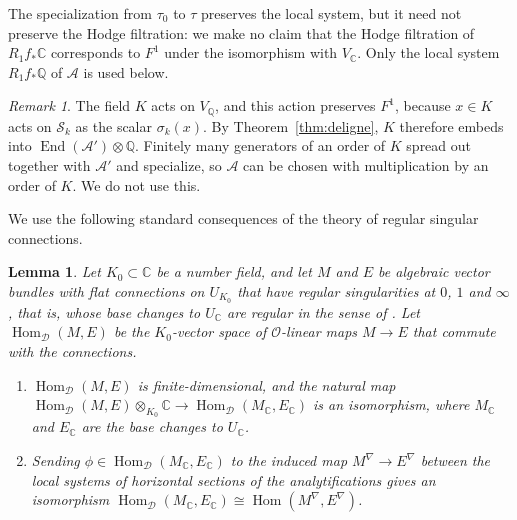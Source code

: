 \documentclass[11pt]{amsart}
\newtheorem{lemma}[theorem]{Lemma}
\theoremstyle{definition}
\theoremstyle{remark}
\newtheorem{remark}[theorem]{Remark}
\numberwithin{equation}{section}
\newcommand{\Q}{\mathbb{Q}}
\newcommand{\C}{\mathbb{C}}
\newcommand{\cS}{\mathcal{S}}
\newcommand{\cO}{\mathcal{O}}
\newcommand{\cD}{\mathcal{D}}
\newcommand{\cA}{\mathcal{A}}
\DeclareMathOperator{\Hom}{Hom}
\DeclareMathOperator{\End}{End}
\begin{document}
The specialization from $\tau_0$ to $\tau$ preserves the local system, but it need not preserve the Hodge filtration: we make no claim that the Hodge filtration of $R_1f_*\C$ corresponds to $F^1$ under the isomorphism with $V_\C$. Only the local system $R_1f_*\Q$ of $\cA$ is used below.

\begin{remark}\label{rem:mult}
The field $K$ acts on $V_\Q$, and this action preserves $F^1$, because $x\in K$ acts on $\cS_k$ as the scalar $\sigma_k(x)$. By Theorem~\ref{thm:deligne}, $K$ therefore embeds into $\End(\cA')\otimes\Q$. Finitely many generators of an order of $K$ spread out together with $\cA'$ and specialize, so $\cA$ can be chosen with multiplication by an order of $K$. We do not use this.
\end{remark}

We use the following standard consequences of the theory of regular singular connections.

\begin{lemma}\label{lem:descent}
Let $K_0\subset\C$ be a number field, and let $M$ and $E$ be algebraic vector bundles with flat connections on $U_{K_0}$ that have regular singularities at $0$, $1$ and $\infty$, that is, whose base changes to $U_\C$ are regular in the sense of \citet[D\'efinition~II.4.5]{Deligne1970}. Let $\Hom_{\cD}(M,E)$ be the $K_0$-vector space of $\cO$-linear maps $M\to E$ that commute with the connections.
\begin{enumerate}[label=\textup{(\alph*)},leftmargin=2em]
\item $\Hom_{\cD}(M,E)$ is finite-dimensional, and the natural map $\Hom_{\cD}(M,E)\otimes_{K_0}\C\to\Hom_{\cD}(M_\C,E_\C)$ is an isomorphism, where $M_\C$ and $E_\C$ are the base changes to $U_\C$.
\item Sending $\phi\in\Hom_{\cD}(M_\C,E_\C)$ to the induced map $M^\nabla\to E^\nabla$ between the local systems of horizontal sections of the analytifications gives an isomorphism $\Hom_{\cD}(M_\C,E_\C)\cong\Hom(M^\nabla,E^\nabla)$.
\end{enumerate}
\end{lemma}
\end{document}
